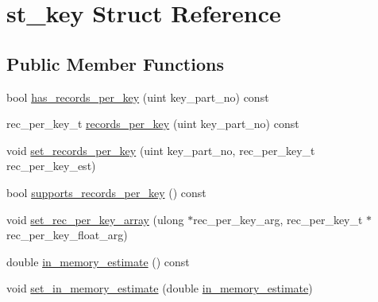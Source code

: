 \hypertarget{structst__key}{}\section{st\+\_\+key Struct Reference}
\label{structst__key}
\subsection*{Public Member Functions}
\begin{DoxyCompactItemize}
\item 
bool \mbox{\hyperlink{structst__key_afaabcd2590cce5bf8db525d11a093fca}{has\+\_\+records\+\_\+per\+\_\+key}} (uint key\+\_\+part\+\_\+no) const
\item 
rec\+\_\+per\+\_\+key\+\_\+t \mbox{\hyperlink{structst__key_a74a67a852132dc677396f5e446d2d67a}{records\+\_\+per\+\_\+key}} (uint key\+\_\+part\+\_\+no) const
\item 
void \mbox{\hyperlink{structst__key_a5f3505facd17da0a896875df1b2fdb49}{set\+\_\+records\+\_\+per\+\_\+key}} (uint key\+\_\+part\+\_\+no, rec\+\_\+per\+\_\+key\+\_\+t rec\+\_\+per\+\_\+key\+\_\+est)
\item 
bool \mbox{\hyperlink{structst__key_a8fb59a5bb0f270960ef6ffac8190869e}{supports\+\_\+records\+\_\+per\+\_\+key}} () const
\item 
void \mbox{\hyperlink{structst__key_afc4c27a73647808d4bec5eb623882dbe}{set\+\_\+rec\+\_\+per\+\_\+key\+\_\+array}} (ulong $\ast$rec\+\_\+per\+\_\+key\+\_\+arg, rec\+\_\+per\+\_\+key\+\_\+t $\ast$rec\+\_\+per\+\_\+key\+\_\+float\+\_\+arg)
\item 
double \mbox{\hyperlink{structst__key_ae2a5ab21c66d08495387149a0206b0be}{in\+\_\+memory\+\_\+estimate}} () const
\item 
void \mbox{\hyperlink{structst__key_afcffbcd4e79b07f12e8c0ffd0ac13c67}{set\+\_\+in\+\_\+memory\+\_\+estimate}} (double \mbox{\hyperlink{structst__key_ae2a5ab21c66d08495387149a0206b0be}{in\+\_\+memory\+\_\+estimate}})
\end{DoxyCompactItemize}
